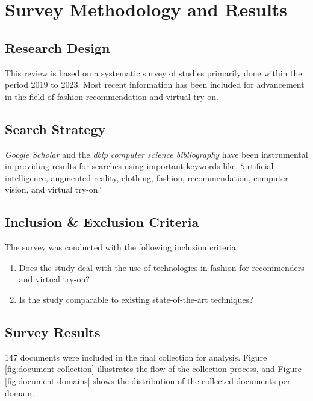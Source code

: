 \section{\textbf{Survey Methodology and Results}} \label{section:survey-methodology}
	\subsection{\textbf{Research Design}}
		This review is based on a systematic survey of studies primarily done within the period 2019 to 2023. Most recent information has been included for advancement in the field of fashion recommendation and virtual try-on.
	
	\subsection{\textbf{Search Strategy}}
		\textit{Google Scholar} and the \textit{dblp computer science bibliography} have been instrumental in providing results for searches using important keywords like, `artificial intelligence, augmented reality, clothing, fashion, recommendation, computer vision, and virtual try-on.'

	\subsection{\textbf{Inclusion \& Exclusion Criteria}}
		The survey was conducted with the following inclusion criteria:
		\begin{enumerate}
			\item Does the study deal with the use of technologies in fashion for recommenders and virtual try-on?
			\item Is the study comparable to existing state-of-the-art techniques?
		\end{enumerate}
	
	\subsection{\textbf{Survey Results}}
		147 documents were included in the final collection for analysis. Figure \ref{fig:document-collection} illustrates the flow of the collection process, and Figure \ref{fig:document-domains} shows the distribution of the collected documents per domain.

